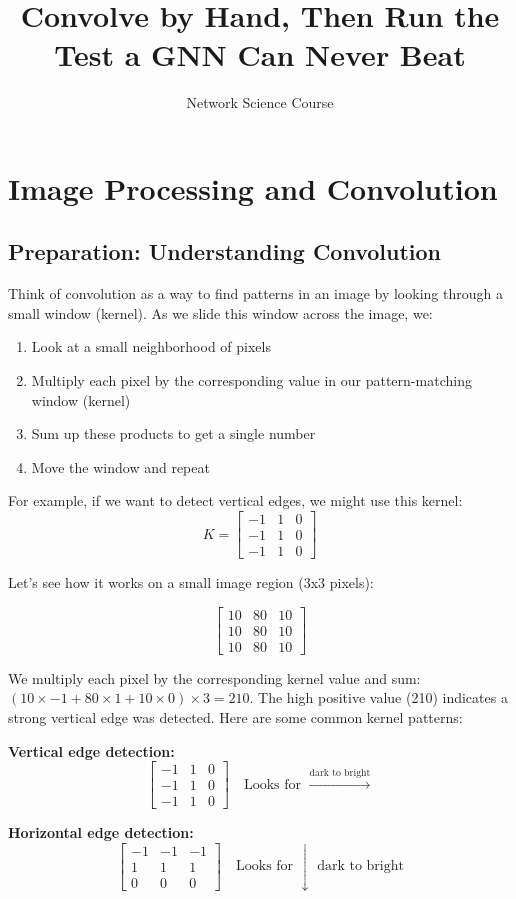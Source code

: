 \documentclass[a4paper, 12pt]{extarticle}
\title{Convolve by Hand, Then Run the Test a GNN Can Never Beat}
\author{Network Science Course}
\date{}
\begin{document}
\section{Image Processing and Convolution}

\subsection{Preparation: Understanding Convolution}
Think of convolution as a way to find patterns in an image by looking through a small window (kernel). As we slide this window across the image, we:
\begin{enumerate}
    \item Look at a small neighborhood of pixels
    \item Multiply each pixel by the corresponding value in our pattern-matching window (kernel)
    \item Sum up these products to get a single number
    \item Move the window and repeat
\end{enumerate}

For example, if we want to detect vertical edges, we might use this kernel:
\[
K = \begin{bmatrix}
-1 & 1 & 0 \\
-1 & 1 & 0 \\
-1 & 1 & 0
\end{bmatrix}
\]

Let's see how it works on a small image region (3x3 pixels):

\[
\begin{bmatrix}
10 & 80 & 10 \\
10 & 80 & 10 \\
10 & 80 & 10
\end{bmatrix}
\]

We multiply each pixel by the corresponding kernel value and sum: $(10 \times -1 + 80 \times 1 + 10 \times 0) \times 3 = 210$. The high positive value (210) indicates a strong vertical edge was detected.
Here are some common kernel patterns:

\textbf{Vertical edge detection:}
\[
\begin{bmatrix}
-1 & 1 & 0 \\
-1 & 1 & 0 \\
-1 & 1 & 0
\end{bmatrix}
\quad
\text{Looks for } \xrightarrow{\text{dark to bright}}
\]

\textbf{Horizontal edge detection:}
\[
\begin{bmatrix}
-1 & -1 & -1 \\
1 & 1 & 1 \\
0 & 0 & 0
\end{bmatrix}
\quad
\text{Looks for } \downarrow \text{ dark to bright}
\]
\end{document}
